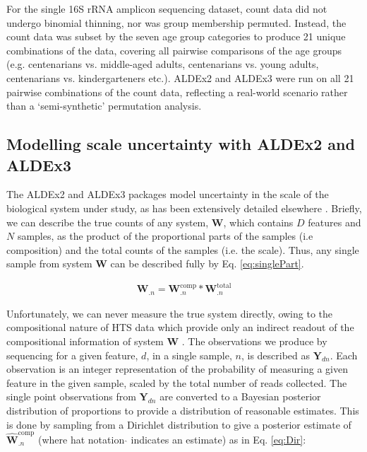 \documentclass[10pt,letterpaper]{article}
\begin{document}
For the single 16S rRNA amplicon sequencing dataset, count data did not undergo binomial thinning, nor was group membership permuted. Instead, the count data was subset by the seven age group categories to produce 21 unique combinations of the data, covering all pairwise comparisons of the age groups (e.g. centenarians vs. middle-aged adults, centenarians vs. young adults, centenarians vs. kindergarteners etc.). ALDEx2 and ALDEx3 were run on all 21 pairwise combinations of the count data, reflecting a real-world scenario rather than a `semi-synthetic' permutation analysis.

\subsection*{Modelling scale uncertainty with ALDEx2 and ALDEx3}
The ALDEx2 and ALDEx3 packages model uncertainty in the scale of the biological system under study, as has been extensively detailed elsewhere \cite{nixon_incorporating_2025, gloor_explicit_2025}. Briefly, we can describe the true counts of any system, $\mathbf{W}$, which contains $D$ features and $N$ samples, as the product of the proportional parts of the samples (i.e composition) and the total counts of the samples (i.e. the scale). Thus, any single sample from system $\mathbf{W}$ can be described fully by Eq. \ref{eq:singlePart}.

\begin{eqnarray}
	\label{eq:singlePart}
	\mathbf{W}_{.n} = \mathbf{W}^{\mathrm{comp}}_{.n} * \mathbf{W}^{\mathrm{total}}_{.n} 
\end{eqnarray}

Unfortunately, we can never measure the true system directly, owing to the compositional nature of HTS data which provide only an indirect readout of the compositional information of system $\mathbf{W}$ \cite{lovell_proportions_2011, gloor_microbiome_2017}. The observations we produce by sequencing for a given feature, $d$, in a single sample, $n$, is described as $\mathbf{Y}_{dn}$. Each observation is an integer representation of the probability of measuring a given feature in the given sample, scaled by the total number of reads collected\cite{fernandes:2013}. The single point observations from $\mathbf{Y}_{dn}$ are converted to a Bayesian posterior distribution of proportions \cite{fernandes:2013} to provide a distribution of reasonable estimates. This is done by sampling from a Dirichlet distribution to give a posterior estimate of $\hat{\mathbf{W}}^{\mathrm{comp}}_{.n}$ \cite{fernandes:2014} (where hat notation $\hat{}$ indicates an estimate) as in Eq. \ref{eq:Dir}:
\end{document}
